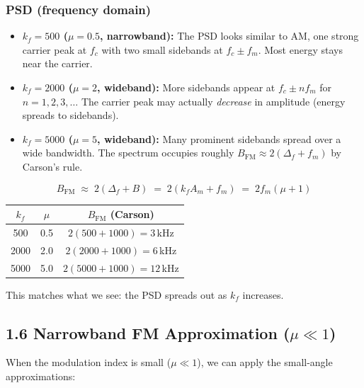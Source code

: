 \documentclass[../../main.tex]{subfiles}
\begin{document}
\subsubsection{PSD (frequency domain)}
\begin{itemize}[leftmargin=1.5em]
  \item \textbf{$k_f = 500$ ($\mu = 0.5$, narrowband):} The PSD looks similar to AM, one strong carrier peak at $f_c$ with two small sidebands at $f_c \pm f_m$. Most energy stays near the carrier.
  \item \textbf{$k_f = 2000$ ($\mu = 2$, wideband):} More sidebands appear at $f_c \pm n f_m$ for $n = 1, 2, 3, \ldots$ The carrier peak may actually \emph{decrease} in amplitude (energy spreads to sidebands).
  \item \textbf{$k_f = 5000$ ($\mu = 5$, wideband):} Many prominent sidebands spread over a wide bandwidth. The spectrum occupies roughly $B_\text{FM} \approx 2(\Delta_f + f_m)$ by Carson's rule.
\end{itemize}

\begin{KeyBox}
\[
  B_\text{FM} \;\approx\; 2(\Delta_f + B) \;=\; 2(k_f A_m + f_m) \;=\; 2 f_m(\mu + 1)
\]
\begin{center}
\begin{tabular}{ccc}
\toprule
$k_f$ & $\mu$ & $B_\text{FM}$ (Carson) \\
\midrule
500  & 0.5 & $2(500 + 1000) = 3$\,kHz \\
2000 & 2.0 & $2(2000 + 1000) = 6$\,kHz \\
5000 & 5.0 & $2(5000 + 1000) = 12$\,kHz \\
\bottomrule
\end{tabular}
\end{center}
This matches what we see: the PSD spreads out as $k_f$ increases.
\end{KeyBox}

\vspace{0.5em}

\vspace{1.5em}

\newpage

\subsection{1.6 \; Narrowband FM Approximation ($\mu \ll 1$)}

When the modulation index is small ($\mu \ll 1$), we can apply the small-angle approximations:
\end{document}
